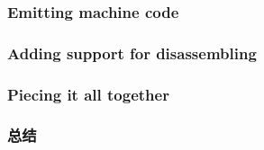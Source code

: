 \documentclass[11pt,a4paper,UTF8]{ctexart}
\begin{document}
		\subsubsection{Emitting machine code}
		\subsubsection{Adding support for disassembling}
		\subsubsection{Piecing it all together}
		\subsubsection{总结}
\end{document}
